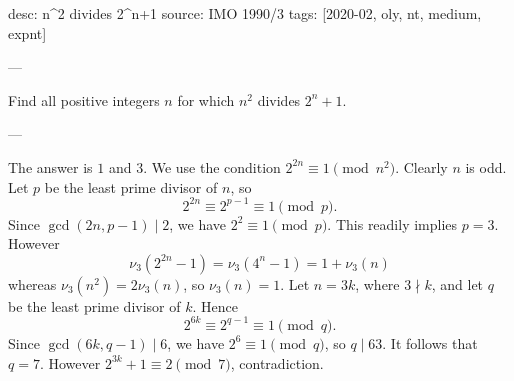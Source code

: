 desc: n^2 divides 2^n+1
source: IMO 1990/3
tags: [2020-02, oly, nt, medium, expnt]

---

Find all positive integers $n$ for which $n^2$ divides $2^n+1$.

---

The answer is $1$ and $3$. We use the condition $2^{2n}\equiv1\pmod{n^2}$. Clearly $n$ is odd. Let $p$ be the least prime divisor of $n$, so \[2^{2n}\equiv2^{p-1}\equiv1\pmod p.\]
Since $\gcd(2n,p-1)\mid2$, we have $2^2\equiv1\pmod p$. This readily implies $p=3$. However \[\nu_3\left(2^{2n}-1\right)=\nu_3\left(4^n-1\right)=1+\nu_3(n)\]
whereas $\nu_3(n^2)=2\nu_3(n)$, so $\nu_3(n)=1$. Let $n=3k$, where $3\nmid k$, and let $q$ be the least prime divisor of $k$. Hence \[2^{6k}\equiv2^{q-1}\equiv1\pmod q.\]
Since $\gcd(6k,q-1)\mid6$, we have $2^6\equiv1\pmod q$, so $q\mid63$. It follows that $q=7$. However $2^{3k}+1\equiv2\pmod7$, contradiction.
